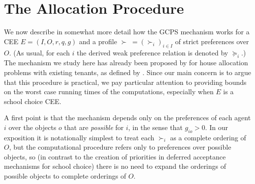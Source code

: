 \documentclass[12pt]{article}
\theoremstyle{definition}
\newtheorem{prop}{Proposition}
\renewcommand{\Re}{\mathbb{R}}
\begin{document}

\section{The Allocation Procedure} \label{sec:Procedure}

We now describe in somewhat more detail how the GCPS mechanism works for a CEE $E = (I,O,r,q,g)$ and a profile $\succ \; = (\succ_i)_{i \in I}$ of strict preferences over $O$.   (As usual, for each $i$ the derived weak preference relation is denoted by $\succeq_i$.)  The mechanism we study here has already been proposed by \cite{yilmaz10geb} for house allocation problems with existing tenants, as defined by \cite{as99jet}.  Since our main concern is to argue that this procedure is practical, we pay particular attention to providing bounds on the worst case running times of the computations, especially when $E$ is a school choice CEE.  

A first point is that the mechanism depends only on the preferences of each agent $i$ over the objects $o$ that are \emph{possible} for $i$, in the sense that $g_{io} > 0$.  In our exposition it is notationally simplest to treat each $\succ_i$ as a complete ordering of $O$, but the computational procedure refers only to preferences over possible objects, so (in contrast to the creation of priorities in deferred acceptance mechanisms for school choice) there is no need to expand the orderings of possible objects to complete orderings of $O$.
\end{document}
